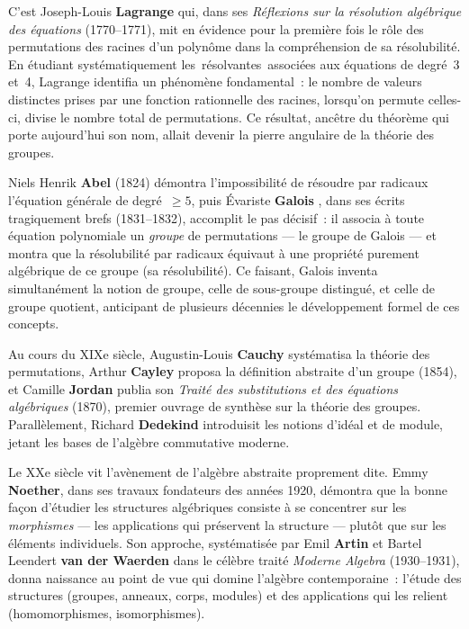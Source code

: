 \documentclass[12pt,a4paper,openany]{book}
\theoremstyle{definition}
\providecommand{\og}{\guillemotleft\,}
\providecommand{\fg}{\,\guillemotright}
\begin{document}
C'est Joseph-Louis \textbf{Lagrange} qui, dans ses \emph{Réflexions sur la
résolution algébrique des équations} (1770--1771), mit en évidence pour la première fois
le rôle des permutations des racines d'un polynôme dans la compréhension de sa
résolubilité. En étudiant systématiquement les \og résolvantes\fg{} associées aux
équations de degré~3 et~4, Lagrange identifia un phénomène fondamental~: le nombre de
valeurs distinctes prises par une fonction rationnelle des racines, lorsqu'on permute
celles-ci, divise le nombre total de permutations. Ce résultat, ancêtre du théorème qui
porte aujourd'hui son nom, allait devenir la pierre angulaire de la théorie des groupes.

Niels Henrik \textbf{Abel} (1824) démontra l'impossibilité de résoudre par
radicaux l'équation générale de degré~$\geq 5$, puis Évariste \textbf{Galois}%
, dans ses écrits tragiquement brefs (1831--1832), accomplit le pas
décisif~: il associa à toute équation polynomiale un \emph{groupe} de permutations ---
le groupe de Galois --- et montra que la résolubilité par radicaux équivaut à une
propriété purement algébrique de ce groupe (sa résolubilité). Ce faisant, Galois inventa
simultanément la notion de groupe, celle de sous-groupe distingué, et celle de groupe
quotient, anticipant de plusieurs décennies le développement formel de ces concepts.

Au cours du XIXe siècle, Augustin-Louis \textbf{Cauchy} systématisa la
théorie des permutations, Arthur \textbf{Cayley} proposa la définition
abstraite d'un groupe (1854), et Camille \textbf{Jordan} publia son
\emph{Traité des substitutions et des équations algébriques} (1870), premier ouvrage de
synthèse sur la théorie des groupes. Parallèlement, Richard \textbf{Dedekind}%
 introduisit les notions d'idéal et de module, jetant les bases de
l'algèbre commutative moderne.

Le XXe siècle vit l'avènement de l'algèbre abstraite proprement dite. Emmy
\textbf{Noether}, dans ses travaux fondateurs des années 1920, démontra
que la bonne façon d'étudier les structures algébriques consiste à se concentrer sur les
\emph{morphismes} --- les applications qui préservent la structure --- plutôt que sur les
éléments individuels. Son approche, systématisée par Emil \textbf{Artin}
et Bartel Leendert \textbf{van der Waerden} dans le célèbre
traité \emph{Moderne Algebra} (1930--1931), donna naissance au point de vue qui domine
l'algèbre contemporaine~: l'étude des structures (groupes, anneaux, corps, modules) et
des applications qui les relient (homomorphismes, isomorphismes).
\end{document}
